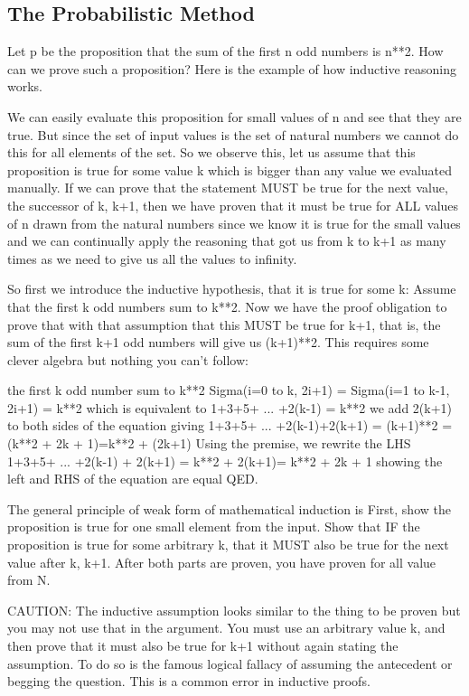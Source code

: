     \subsection {The Probabilistic Method}






Let p be the proposition that the sum of the first n odd numbers is n**2. How can we prove such a proposition? Here is the example of how inductive reasoning works. 

We can easily evaluate this proposition for small values of n and see that they are true. But since the set of input values is the set of natural numbers we cannot do this for all elements of the set. So we observe this, let us assume that this proposition is true for some value k which is bigger than any value we evaluated manually. If we can prove that the statement MUST be true for the next value, the successor of k, k+1, then we have proven that it must be true for ALL values of n drawn from the natural numbers since we know it is true for the small values and we can continually apply the reasoning that got us from k to k+1 as many times as we need to give us all the values to infinity.

So first we introduce the inductive hypothesis, that it is true for some k:
Assume that the first k odd numbers sum to k**2. Now we have the proof obligation to prove that with that assumption that this MUST be true for k+1, that is, the sum of the first k+1 odd numbers will give us (k+1)**2. This requires some clever algebra but nothing you can't follow:

the first k odd number sum to k**2
Sigma(i=0 to k, 2i+1) = Sigma(i=1 to k-1, 2i+1) = k**2
which is equivalent to 
1+3+5+ ... +2(k-1) = k**2
we add 2(k+1) to both sides of the equation giving
1+3+5+ ... +2(k-1)+2(k+1) = (k+1)**2 = (k**2 + 2k + 1)=k**2 + (2k+1)
Using the premise, we rewrite the LHS
1+3+5+ ... +2(k-1)  + 2(k+1) = k**2 + 2(k+1)= k**2 + 2k + 1
showing the left and RHS of the equation are equal QED.

The general principle of weak form of mathematical induction is
First, show the proposition is true for one small element from the input.
Show that IF the proposition is true for some arbitrary k, that it MUST also be true for the next value after k, k+1. 
After both parts are proven, you have proven for all value from N.

CAUTION: The inductive assumption looks similar to the thing to be proven but you may not use that in the argument. You must use an arbitrary value k, and then prove that it must also be true for k+1 without again stating the assumption. To do so is the famous logical fallacy of assuming the antecedent or begging the question. This is a common error in inductive proofs.

